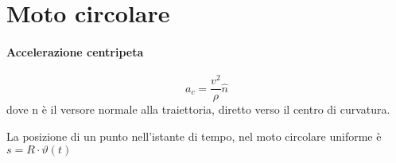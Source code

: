 \section{Moto circolare}

\paragraph{Accelerazione centripeta}

\begin{equation} a_c=\frac{v^2}{\rho}\hat n \end{equation}
dove \hat n è il versore normale alla traiettoria, diretto verso il centro di curvatura.

La posizione di un punto nell'istante di tempo, nel moto circolare uniforme è $s=R\cdot \vartheta (t)$
